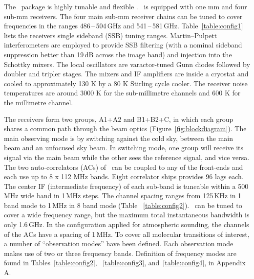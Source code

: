 The \smr\ package is highly tunable and flexible \citep{frisk:theod:03}.
\smr\ is equipped with one mm and four sub-mm receivers.
The four main sub-mm receiver chains can be tuned to cover
frequencies in the ranges 486\,--\,504\,GHz and 541\,--\,581\,GHz.
Table~\ref{table:config1} lists the receivers single sideband (SSB) tuning ranges.
Martin--Pulpett interferometers are employed to provide SSB filtering 
(with a nominal sideband suppression better than 19\,dB across
the image band) and injection into the Schottky mixers.
The local oscillators are varactor-tuned Gunn diodes followed by
doubler and tripler stages. The mixers and IF amplifiers are inside a cryostat and
cooled to approximately 130 K by a 80 K Stirling cycle cooler. The receiver
noise temperatures are around 3000 K for
the sub-millimetre channels and 600 K for the millimetre channel.

The receivers form two groups, A1+A2 and B1+B2+C, in which each group shares
a common path through the beam optics (Figure~\ref{fig:blockdiagram}). 
The main observing mode is by switching against the cold sky, between the
main beam and an unfocused sky beam. In switching mode, one group will
receive its signal via the main beam while the other sees the reference signal,
and vice versa.
The two auto-correlators (ACs) of \smr\ can be coupled to any of the front-ends
and each use up to 8 x 112 MHz bands.
Eight correlator ships provides 96 lags each.
The center IF (intermediate frequency) of each sub-band is tuneable
within a 500\,MHz wide band in 1\,MHz steps. The channel spacing
ranges from 125\,KHz in 1 band mode to 1\,MHz in 8 band mode (Table ~\ref{table:config2}).
\smr\ can be tuned to cover a wide frequency range, but the maximum total instantaneous
bandwidth is only 1.6\,GHz. In the configuration applied for
atmospheric sounding, the channels of the ACs have a spacing of 1\,MHz.
To cover all molecular transitions of interest, a 
number of ``observation modes'' have been defined. Each observation mode makes
use of two or three frequency bands. 
Definition of frequency modes are found in Tables~\ref{table:config2}, 
~\ref{table:config3}, and~\ref{table:config4}, in Appendix A.

